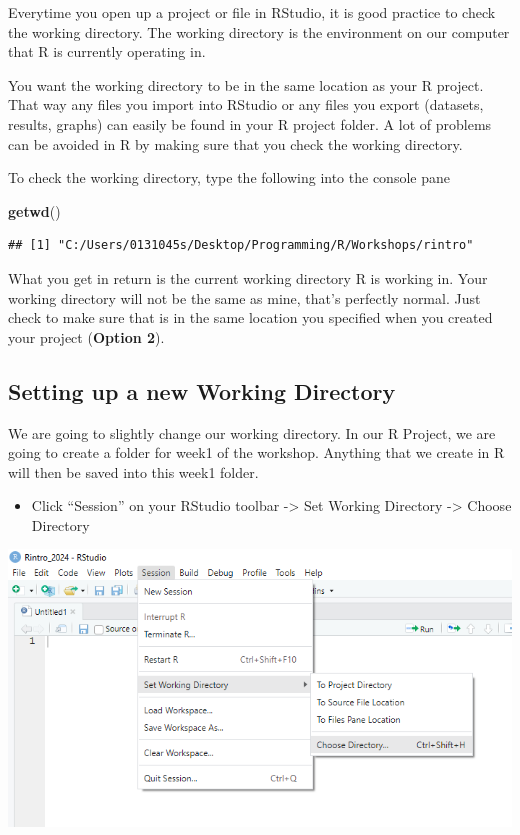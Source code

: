 \documentclass[
]{book}
\newenvironment{Shaded}{\begin{snugshade}}{\end{snugshade}}
\newcommand{\FunctionTok}[1]{\textcolor[rgb]{0.13,0.29,0.53}{\textbf{#1}}}
\newcommand{\NormalTok}[1]{#1}
\providecommand{\tightlist}{%
  \setlength{\itemsep}{0pt}\setlength{\parskip}{0pt}}
\begin{document}
Everytime you open up a project or file in RStudio, it is good practice to check the working directory. The working directory is the environment on our computer that R is currently operating in.

You want the working directory to be in the same location as your R project. That way any files you import into RStudio or any files you export (datasets, results, graphs) can easily be found in your R project folder. A lot of problems can be avoided in R by making sure that you check the working directory.

To check the working directory, type the following into the console pane

\begin{Shaded}
\begin{Highlighting}[]
\FunctionTok{getwd}\NormalTok{()}
\end{Highlighting}
\end{Shaded}

\begin{verbatim}
## [1] "C:/Users/0131045s/Desktop/Programming/R/Workshops/rintro"
\end{verbatim}

What you get in return is the current working directory R is working in. Your working directory will not be the same as mine, that's perfectly normal. Just check to make sure that is in the same location you specified when you created your project (\textbf{Option 2}).

\hypertarget{setting-up-a-new-working-directory}{%
\subsection{Setting up a new Working Directory}\label{setting-up-a-new-working-directory}}

We are going to slightly change our working directory. In our R Project, we are going to create a folder for week1 of the workshop. Anything that we create in R will then be saved into this week1 folder.

\begin{itemize}
\tightlist
\item
  Click ``Session'' on your RStudio toolbar -\textgreater{} Set Working Directory -\textgreater{} Choose Directory
\end{itemize}

\includegraphics{img/01-wd.png}
\end{document}
